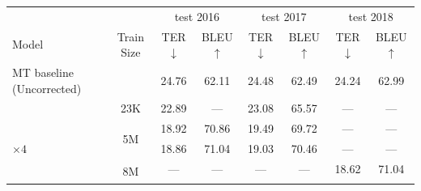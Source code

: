 \begin{landscape}
    \begin{table}[t]
        \centering
        \begin{tabular}{lccccccc}
            \toprule
                                                             &                & \multicolumn{2}{c}{test 2016} &
            \multicolumn{2}{c}{test 2017}                    &
            \multicolumn{2}{c}{test 2018}                                                                                                      \\
            \cmidrule{3-4} \cmidrule{5-6}  \cmidrule{7-8}
            Model                                            & Train Size     & TER$\downarrow$               & BLEU$\uparrow$ &
            TER$\downarrow$                                  & BLEU$\uparrow$ & TER$\downarrow$               & BLEU$\uparrow$                 \\
            \midrule
            MT baseline (Uncorrected)                        &                &
            24.76                                            & 62.11          & 24.48                         & 62.49          & 24.24 & 62.99 \\
            \midrule
            \citet{berard2017lig}                            &
            \multicolumn{1}{c}{23K}                          &
            22.89                                            & ---            & 23.08                         & 65.57          & ---   & ---   \\
            \midrule
            \citet{junczys2018ms}                            &
            \multicolumn{1}{c}{\multirow{2}{*}{5M}}          &
            18.92                                            & 70.86          & 19.49                         & 69.72          & ---   & ---   \\
            \citet{junczys2018ms}$\times 4$                  &
            \multicolumn{1}{c}{}                             &
            18.86                                            & 71.04          & 19.03                         & 70.46          & ---   & ---   \\
            \midrule
            \citet{tebbifakhr2018multi}                      &
            \multicolumn{1}{c}{\multirow{3}{*}{8M}}          &
            ---                                              & ---            & ---                           & ---            & 18.62 & 71.04 \\
            \citet{junczys2018ms}                            &

\end{tabular}
\end{table}
\end{landscape}
